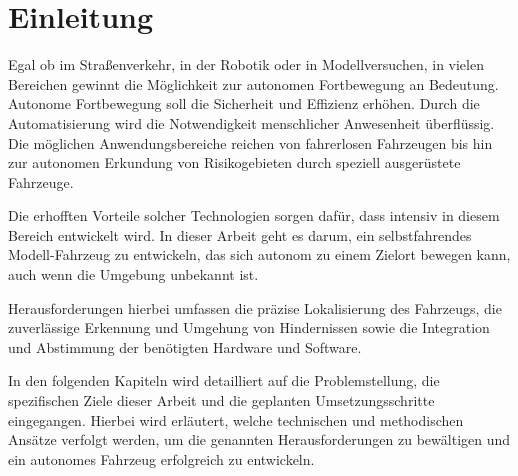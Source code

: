 \section{Einleitung}

Egal ob im Straßenverkehr, in der Robotik oder in Modellversuchen, in vielen Bereichen gewinnt die Möglichkeit zur autonomen Fortbewegung an Bedeutung. 
Autonome Fortbewegung soll die Sicherheit und Effizienz erhöhen. 
Durch die Automatisierung wird die Notwendigkeit menschlicher Anwesenheit überflüssig. 
Die möglichen Anwendungsbereiche reichen von fahrerlosen Fahrzeugen bis hin zur autonomen Erkundung von Risikogebieten durch speziell ausgerüstete Fahrzeuge.

Die erhofften Vorteile solcher Technologien sorgen dafür, dass intensiv in diesem Bereich entwickelt wird. 
In dieser Arbeit geht es darum, ein selbstfahrendes Modell-Fahrzeug zu entwickeln, das sich autonom zu einem Zielort bewegen kann, auch wenn die Umgebung unbekannt ist.

Herausforderungen hierbei umfassen die präzise Lokalisierung des Fahrzeugs, 
die zuverlässige Erkennung und Umgehung von Hindernissen sowie die Integration und Abstimmung der benötigten Hardware und Software.

In den folgenden Kapiteln wird detailliert auf die Problemstellung, die spezifischen Ziele dieser Arbeit und die geplanten Umsetzungsschritte eingegangen. 
Hierbei wird erläutert, welche technischen und methodischen Ansätze verfolgt werden, um die genannten Herausforderungen zu bewältigen und ein autonomes Fahrzeug erfolgreich zu entwickeln.
